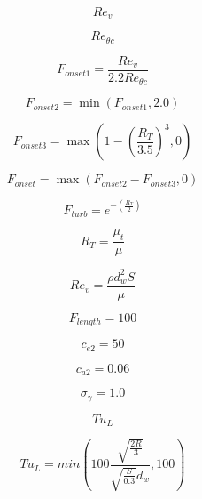 \begin{equation}
Re_{v}
\end{equation}

\begin{equation}
Re_{\theta c}
\end{equation}

\begin{equation}
F_{onset1}=\frac{Re_{v}}{2.2Re_{\theta c}}
\end{equation}

\begin{equation}
F_{onset2}=\min (F_{onset1}, 2.0)
\end{equation}

\begin{equation}
F_{onset3}=\max (1-(\frac{R_{T}}{3.5})^{3}, 0)
\end{equation}

\begin{equation}
    F_{onset}=\max (F_{onset2}-F_{onset3},0)
\end{equation}

\begin{equation}
F_{turb}=e^{-(\frac{R_{T}}{2})}
\end{equation}

\begin{equation}
R_{T}=\frac{\mu_{t}}{\mu}
\end{equation}

\begin{equation}
Re_{v}=\frac{\rho d_{w}^{2}S}{\mu}
\end{equation}

\begin{equation}
  F_{length}=100
\end{equation}

\begin{equation}
  c_{e2}=50
\end{equation}

\begin{equation}
  c_{a2}=0.06
\end{equation}

\begin{equation}
  \sigma_{\gamma}=1.0  
\end{equation}

\begin{equation}
Tu_{L}
\end{equation}

\begin{equation}
Tu_{L}=min(100 \frac{\sqrt{\frac{2R}{3}}}{\sqrt{\frac{S}{0.3}}d_{w}}, 100)
\end{equation}

